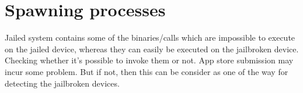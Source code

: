 \section{Spawning processes}
\vspace{20px}
Jailed system contains some of the binaries/calls which are impossible to execute on the jailed device, whereas they can easily be executed on the jailbroken device. Checking whether it's possible to invoke them or not. App store submission may incur some problem. But if not, then this can be consider as one of the way for detecting the jailbroken devices. \\
	\begin{center}
	\end{center}




\newpage

